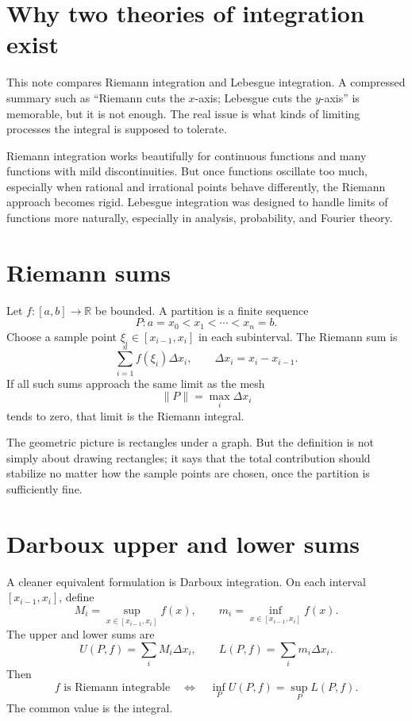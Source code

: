 
\section{Why two theories of integration exist}

This note compares Riemann integration and Lebesgue integration.  A compressed summary such as “Riemann cuts the $x$-axis; Lebesgue cuts the $y$-axis” is memorable, but it is not enough.  The real issue is what kinds of limiting processes the integral is supposed to tolerate.

Riemann integration works beautifully for continuous functions and many functions with mild discontinuities.  But once functions oscillate too much, especially when rational and irrational points behave differently, the Riemann approach becomes rigid.  Lebesgue integration was designed to handle limits of functions more naturally, especially in analysis, probability, and Fourier theory.

\section{Riemann sums}

Let $f:[a,b]\to\mathbb R$ be bounded.  A partition is a finite sequence
\[
  P:a=x_0<x_1<\cdots<x_n=b.
\]
Choose a sample point $\xi_i\in[x_{i-1},x_i]$ in each subinterval.  The Riemann sum is
\[
  \sum_{i=1}^n f(\xi_i)\Delta x_i,
  \qquad
  \Delta x_i=x_i-x_{i-1}.
\]
If all such sums approach the same limit as the mesh
\[
  \|P\|=\max_i \Delta x_i
\]
tends to zero, that limit is the Riemann integral.

The geometric picture is rectangles under a graph.  But the definition is not simply about drawing rectangles; it says that the total contribution should stabilize no matter how the sample points are chosen, once the partition is sufficiently fine.

\section{Darboux upper and lower sums}

A cleaner equivalent formulation is Darboux integration.  On each interval $[x_{i-1},x_i]$, define
\[
  M_i=\sup_{x\in[x_{i-1},x_i]} f(x),
  \qquad
  m_i=\inf_{x\in[x_{i-1},x_i]} f(x).
\]
The upper and lower sums are
\[
  U(P,f)=\sum_i M_i\Delta x_i,
  \qquad
  L(P,f)=\sum_i m_i\Delta x_i.
\]
Then
\[
  f\text{ is Riemann integrable}
  \quad\Longleftrightarrow\quad
  \inf_P U(P,f)=\sup_P L(P,f).
\]
The common value is the integral.


